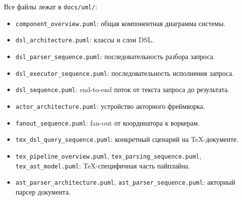 \documentclass[12pt,a4paper]{article}
\newcommand{\code}[1]{\texttt{#1}}
\begin{document}
Все файлы лежат в \code{docs/uml/}:

\begin{itemize}
  \item \code{component\_overview.puml}: общая компонентная
        диаграмма системы.
  \item \code{dsl\_architecture.puml}: классы и слои DSL.
  \item \code{dsl\_parser\_sequence.puml}: последовательность
        разбора запроса.
  \item \code{dsl\_executor\_sequence.puml}: последовательность
        исполнения запроса.
  \item \code{dsl\_sequence.puml}: end-to-end поток от текста
        запроса до результата.
  \item \code{actor\_architecture.puml}: устройство акторного
        фреймворка.
  \item \code{fanout\_sequence.puml}: fan-out от координатора
        к воркерам.
  \item \code{tex\_dsl\_query\_sequence.puml}: конкретный
        сценарий на TeX-документе.
  \item \code{tex\_pipeline\_overview.puml},
        \code{tex\_parsing\_sequence.puml},
        \code{tex\_ast\_model.puml}: TeX-специфичная часть
        пайплайна.
  \item \code{ast\_parser\_architecture.puml},
        \code{ast\_parser\_sequence.puml}: акторный парсер
        документа.
\end{itemize}
\end{document}
